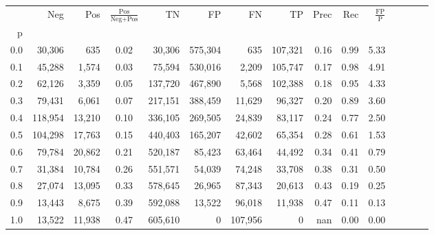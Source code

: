 \begin{tabular}{rrrcrrrrrrrrrrr}
\toprule
{} &      Neg &     Pos & $\frac{\text{Pos}}{\text{Neg}+\text{Pos}}$ &       TN &       FP &       FN &       TP &  Prec &   Rec & $\frac{\text{FP}}{\text{P}}$ \\
p   &          &         &                                            &          &          &          &          &       &       &                              \\
\midrule
0.0 &   30,306 &     635 &                                       0.02 &   30,306 &  575,304 &      635 &  107,321 &  0.16 &  0.99 &                         5.33 \\
0.1 &   45,288 &   1,574 &                                       0.03 &   75,594 &  530,016 &    2,209 &  105,747 &  0.17 &  0.98 &                         4.91 \\
0.2 &   62,126 &   3,359 &                                       0.05 &  137,720 &  467,890 &    5,568 &  102,388 &  0.18 &  0.95 &                         4.33 \\
0.3 &   79,431 &   6,061 &                                       0.07 &  217,151 &  388,459 &   11,629 &   96,327 &  0.20 &  0.89 &                         3.60 \\
0.4 &  118,954 &  13,210 &                                       0.10 &  336,105 &  269,505 &   24,839 &   83,117 &  0.24 &  0.77 &                         2.50 \\
0.5 &  104,298 &  17,763 &                                       0.15 &  440,403 &  165,207 &   42,602 &   65,354 &  0.28 &  0.61 &                         1.53 \\
0.6 &   79,784 &  20,862 &                                       0.21 &  520,187 &   85,423 &   63,464 &   44,492 &  0.34 &  0.41 &                         0.79 \\
0.7 &   31,384 &  10,784 &                                       0.26 &  551,571 &   54,039 &   74,248 &   33,708 &  0.38 &  0.31 &                         0.50 \\
0.8 &   27,074 &  13,095 &                                       0.33 &  578,645 &   26,965 &   87,343 &   20,613 &  0.43 &  0.19 &                         0.25 \\
0.9 &   13,443 &   8,675 &                                       0.39 &  592,088 &   13,522 &   96,018 &   11,938 &  0.47 &  0.11 &                         0.13 \\
1.0 &   13,522 &  11,938 &                                       0.47 &  605,610 &        0 &  107,956 &        0 &   nan &  0.00 &                         0.00 \\
\bottomrule
\end{tabular}
